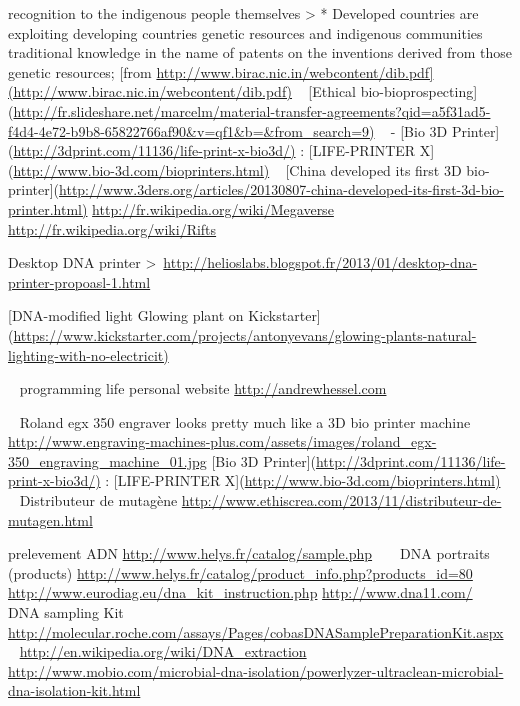 recognition to the indigenous people themselves
{\textgreater} * Developed countries are exploiting developing countries
genetic resources and indigenous communities traditional knowledge in
the name of patents on the inventions derived from those genetic
resources;
[from
\href{http://www.birac.nic.in/webcontent/dib.pdf](http://www.birac.nic.in/webcontent/dib.pdf)}{http://www.birac.nic.in/webcontent/dib.pdf](http://www.birac.nic.in/webcontent/dib.pdf)}
~
[Ethical
bio-bioprospecting](\url{http://fr.slideshare.net/marcelm/material-transfer-agreements?qid=a5f31ad5-f4d4-4e72-b9b8-65822766af90&v=qf1&b=&from_search=9)}
~
{}-
[Bio 3D Printer](\url{http://3dprint.com/11136/life-print-x-bio3d/)} :
[LIFE-PRINTER X](\url{http://www.bio-3d.com/bioprinters.html)}
~
[China developed its first 3D
bio-printer](\url{http://www.3ders.org/articles/20130807-china-developed-its-first-3d-bio-printer.html)}
\url{http://fr.wikipedia.org/wiki/Megaverse}
\url{http://fr.wikipedia.org/wiki/Rifts}

\bigskip
Desktop DNA printer
{\textgreater}~\url{http://helioslabs.blogspot.fr/2013/01/desktop-dna-printer-propoasl-1.html}

\bigskip

[DNA-modified light Glowing plant on
Kickstarter](\url{https://www.kickstarter.com/projects/antonyevans/glowing-plants-natural-lighting-with-no-electricit)}

~
programming life personal website
\href{http://andrewhessel.com/}{http://andrewhessel.com}

\bigskip

~
Roland egx 350 engraver looks pretty much like a 3D bio printer machine
\url{http://www.engraving-machines-plus.com/assets/images/roland_egx-350_engraving_machine_01.jpg}
[Bio 3D Printer](\url{http://3dprint.com/11136/life-print-x-bio3d/)} :
[LIFE-PRINTER X](\url{http://www.bio-3d.com/bioprinters.html)}
~
Distributeur de mutag\`ene
\url{http://www.ethiscrea.com/2013/11/distributeur-de-mutagen.html}

\bigskip

prelevement ADN
\url{http://www.helys.fr/catalog/sample.php}
~
~
DNA portraits (products)
\url{http://www.helys.fr/catalog/product_info.php?products_id=80}
\url{http://www.eurodiag.eu/dna_kit_instruction.php}
\url{http://www.dna11.com/}
~
DNA sampling Kit
\url{http://molecular.roche.com/assays/Pages/cobasDNASamplePreparationKit.aspx}
~
\url{http://en.wikipedia.org/wiki/DNA_extraction}
\url{http://www.mobio.com/microbial-dna-isolation/powerlyzer-ultraclean-microbial-dna-isolation-kit.html}

